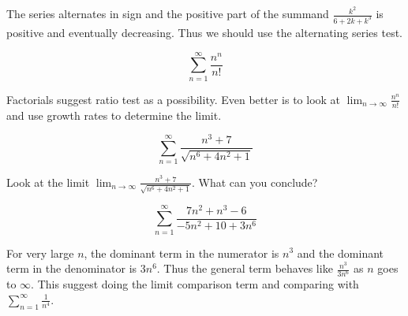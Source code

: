 \documentclass{ximera}
\begin{document}
\begin{exercise}
\begin{exercise}
\begin{multipleChoice}
\end{multipleChoice}

\begin{feedback}[correct]
The series alternates in sign and the positive part of the summand $\frac{k^2}{6+2k+k^3}$ is positive and eventually decreasing. Thus we should use the alternating series test. 
\end{feedback}
\end{exercise}

\begin{exercise}

\[
\sum^{\infty}_{n=1} \frac{n^n}{n!}
\]


\begin{multipleChoice}
\end{multipleChoice}


\begin{feedback}[correct]
Factorials suggest ratio test as a possibility. Even better is to look at $\lim_{n \to \infty} \frac{n^n}{n!}$ and use growth rates to determine the limit. 
\end{feedback}
\end{exercise}

\begin{exercise}

\[
\sum^{\infty}_{n=1} \frac{n^3+7}{\sqrt{n^6+4n^2+1}}
\]

\begin{multipleChoice}
\end{multipleChoice}



\begin{feedback}[correct]
Look at the limit $\lim_{n \to \infty} \frac{n^3+7}{\sqrt{n^6+4n^2+1}}$. What can you conclude?
\end{feedback}
\end{exercise}


\begin{exercise}


\[
\sum^{\infty}_{n=1} \frac{7n^2+n^3-6}{-5n^2+10+3n^6}
\]


\begin{multipleChoice}
\end{multipleChoice}


\begin{feedback}[correct]
For very large $n$, the dominant term in the numerator is $n^3$ and the dominant term in the denominator is $3n^6$. Thus the general term 
behaves like $\frac{n^3}{3n^6}$ as $n$ goes to $\infty$. This suggest doing the limit comparison term and comparing with $\sum^{\infty}_{n=1} \frac{1}{n^4}$. 
\end{feedback}


\end{exercise}
\end{exercise}
\end{document}

